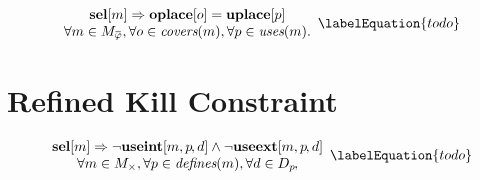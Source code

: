 \begin{equation}
  \begin{array}{c}
    \mVar{sel}[m] \mImp \mVar{oplace}[o] = \mVar{uplace}[p] \\
    \forall m \in \mPhiMatchCompSet,
    \forall o \in \mCovers(m),
    \forall p \in \mUses(m).
  \end{array}
  \labelEquation{todo}
\end{equation}


\section{Refined Kill Constraint}



\begin{equation}
  \begin{array}{c}
    \mVar{sel}[m]
    \mImp
    \neg\mVar{useint}[m, p \hspace{-1pt}, d]
    \mAnd
    \neg\mVar{useext}[m, p \hspace{-1pt}, d] \\
    \forall m \in \mKillMatchSet,
    \forall p \in \mDefines(m),
    \forall d \in \mDataSet[p] \hspace{-1pt},
  \end{array}
  \labelEquation{todo}
\end{equation}

